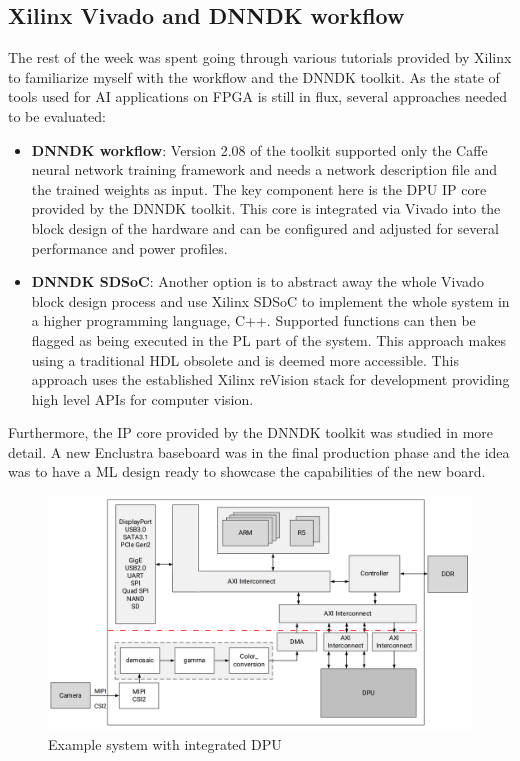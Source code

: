 \subsection{Xilinx Vivado and \acs{DNNDK} workflow}
The rest of the week was spent going through various tutorials provided by Xilinx to familiarize myself with the workflow and the \ac{DNNDK} toolkit. As the state of tools used for \ac{AI} applications on \ac{FPGA} is still in flux, several approaches needed to be evaluated:
\begin{itemize}
	\item \textbf{\ac{DNNDK} workflow}: Version 2.08 of the toolkit supported only the Caffe neural network training framework and needs a network description file and the trained weights as input. The key component here is the \ac{DPU} \ac{IP} core provided by the \ac{DNNDK} toolkit. This core is integrated via Vivado into the block design of the hardware and can be configured and adjusted for several performance and power profiles.
	\item \textbf{\ac{DNNDK} \ac{SDSoC}}: Another option is to abstract away the whole Vivado block design process and use Xilinx \ac{SDSoC} to implement the whole system in a higher programming language, C++. Supported functions can then be flagged as being executed in the \ac{PL} part of the system. This approach makes using a traditional \ac{HDL} obsolete and is deemed more accessible. This approach uses the established Xilinx reVision stack for development providing high level \acp{API} for computer vision.
\end{itemize}
Furthermore, the \ac{IP} core provided by the \ac{DNNDK} toolkit was studied in more detail. A new Enclustra baseboard was in the final production phase and the idea was to have a \ac{ML} design ready to showcase the capabilities of the new board.
\begin{figure}[!htb]
	\centering
		\includegraphics[width=\textwidth]{bilder/DPU_example_design.png}
		\caption{Example system with integrated \acs{DPU} \cite[p.~8]{dpu}}
		\label{fig:dpu_example}
\end{figure}
